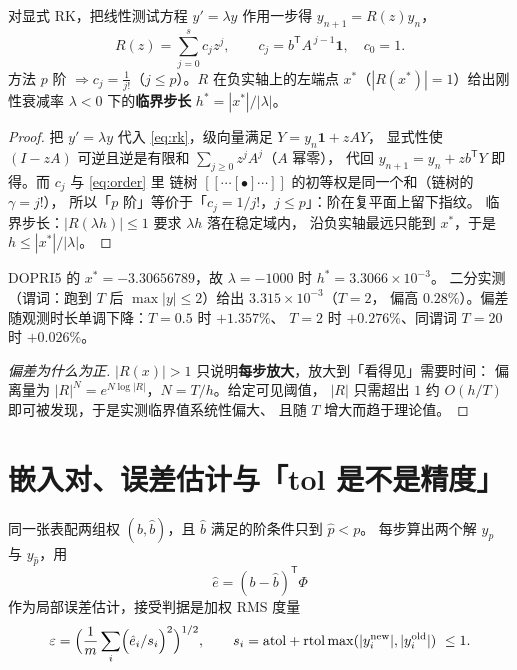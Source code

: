 \begin{theorem}
\label{thm:stab-poly}
对显式 RK，把线性测试方程 $y'=\lambda y$ 作用一步得 $y_{n+1}=R(z)y_n$，
\begin{equation}
  R(z)=\sum_{j=0}^{s}c_jz^j,\qquad c_j=b^{\mathsf T}A^{\,j-1}\mathbf{1},\quad c_0=1 .
\end{equation}
方法 $p$ 阶 $\Longrightarrow c_j=\frac1{j!}$（$j\le p$）。$R$ 在负实轴上的左端点
$x^\ast$（$|R(x^\ast)|=1$）给出刚性衰减率 $\lambda<0$ 下的\textbf{临界步长}
$h^\ast=|x^\ast|/|\lambda|$。
\end{theorem}

\begin{proof}
把 $y'=\lambda y$ 代入 \eqref{eq:rk}，级向量满足 $Y=y_n\mathbf{1}+zAY$，
显式性使 $(I-zA)$ 可逆且逆是有限和 $\sum_{j\ge0}z^jA^j$（$A$ 幂零），
代回 $y_{n+1}=y_n+zb^{\mathsf T}Y$ 即得。而 $c_j$ 与 \eqref{eq:order} 里
链树 $[[\cdots[\bullet]\cdots]]$ 的初等权是同一个和（链树的 $\gamma=j!$），
所以「$p$ 阶」等价于「$c_j=1/j!$，$j\le p$」：阶在复平面上留下指纹。
临界步长：$|R(\lambda h)|\le1$ 要求 $\lambda h$ 落在稳定域内，
沿负实轴最远只能到 $x^\ast$，于是 $h\le|x^\ast|/|\lambda|$。
\end{proof}

\begin{corollary}[实测：临界步长与有限观测偏差]
\label{cor:critical}
DOPRI5 的 $x^\ast=-3.30656789$，故 $\lambda=-1000$ 时 $h^\ast=3.3066\times10^{-3}$。
二分实测（谓词：跑到 $T$ 后 $\max|y|\le2$）给出 $3.315\times10^{-3}$（$T=2$，
偏高 $0.28\%$）。偏差随观测时长单调下降：$T=0.5$ 时 $+1.357\%$、
$T=2$ 时 $+0.276\%$、同谓词 $T=20$ 时 $+0.026\%$。
\end{corollary}

\begin{proof}[偏差为什么为正]
$|R(x)|>1$ 只说明\textbf{每步放大}，放大到「看得见」需要时间：
偏离量为 $|R|^{N}=e^{N\log|R|}$，$N=T/h$。给定可见阈值，
$|R|$ 只需超出 $1$ 约 $O(h/T)$ 即可被发现，于是实测临界值系统性偏大、
且随 $T$ 增大而趋于理论值。\end{proof}

\section{嵌入对、误差估计与「tol 是不是精度」}

\begin{definition}[嵌入对]
同一张表配两组权 $(b,\hat b)$，且 $\hat b$ 满足的阶条件只到 $\hat p<p$。
每步算出两个解 $y_{p}$ 与 $y_{\hat p}$，用
\begin{equation}
  \hat e=(b-\hat b)^{\mathsf T}\Phi
  \label{eq:embed}
\end{equation}
作为局部误差估计，接受判据是加权 RMS 度量
\begin{equation}
  \varepsilon=\Bigl(\frac1m\sum_i\Bigl(\hat e_i/s_i\Bigr)^2\Bigr)^{1/2},\qquad
  s_i=\mathrm{atol}+\mathrm{rtol}\max(|y_i^{\text{new}}|,|y_i^{\text{old}}|)\ \le 1 .
  \label{eq:accept}
\end{equation}
\end{definition}

